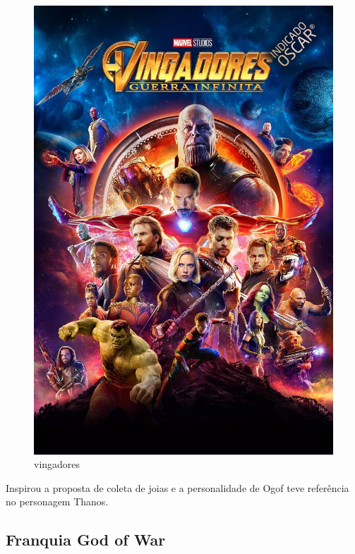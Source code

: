 \begin{figure}[htb]
	\caption{\label{vingadores}vingadores}
	\begin{center}
	    \includegraphics[width=\textwidth/2]{imagens/vingadores.jpeg}
	\end{center}
\end{figure}

Inspirou a proposta de coleta de joias e a personalidade de Ogof teve referência no personagem Thanos.

\pagebreak

\subsection{Franquia God of War}

